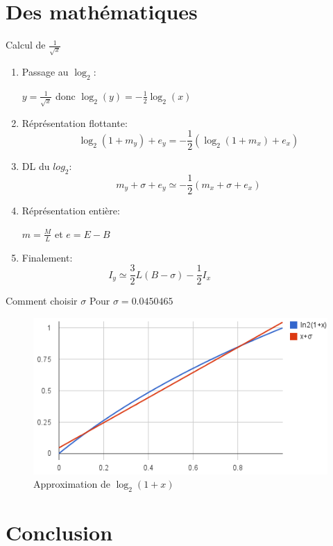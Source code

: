 \documentclass{beamer}
\begin{document}
\section{Des mathématiques}
\begin{frame}{Calcul de $\frac{1}{\sqrt{x}}$}
\begin{enumerate}
\item Passage au $\log_2$: 
\begin{center}
 $y = \frac{1}{\sqrt{x}}$ donc  $\log_2(y) = -\frac{1}{2}\log_2(x)$
\end{center}
\item Réprésentation flottante:
$$\log_2(1 + m_y) + e_y = -\frac{1}{2}(\log_2(1 + m_x) + e_x)$$
\item DL du $log_2$:
$$m_y + \sigma + e_y \simeq -\frac{1}{2}(m_x + \sigma + e_x)$$
\item Réprésentation entière: \\
\begin{center}
$m = \frac{M}{L}$ et $e = E - B$
\end{center}
\item Finalement:
$$ I_y \simeq \frac{3}{2}L(B - \sigma) -\frac{1}{2}I_x ~~~~~~~~~~~~~~~~~~~~~~~~~~~$$
\end{enumerate}
\end{frame}

\begin{frame}{Comment choisir $\sigma$}
Pour $\sigma = 0.0450465$
\begin{figure}
\center
\includegraphics[scale=0.5]{img/ln.png}
\caption{Approximation de $\log_2(1 + x)$}
\end{figure}
\end{frame}

\section{Conclusion}
\end{document}

